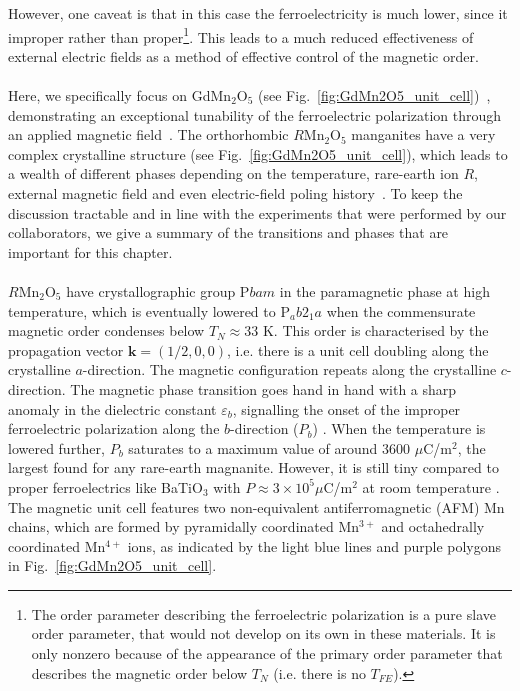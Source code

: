 However, one caveat is that in this case the ferroelectricity is much lower, since it improper rather than proper\footnote{The order parameter describing the ferroelectric polarization is a pure slave order parameter, that would not develop on its own in these materials. It is only nonzero because of the appearance of the primary order parameter that describes the magnetic order below $T_N$ (i.e. there is no $T_{FE}$).}.
This leads to a much reduced effectiveness of external electric fields as a method of effective control of the magnetic order.  
\\\\
Here, we specifically focus on GdMn$_2$O$_5$ (see Fig.~\ref{fig:GdMn2O5_unit_cell})~\cite{Khomskii2009}, demonstrating an exceptional tunability of the ferroelectric polarization through an applied magnetic field~\cite{Lee13}.
The orthorhombic $R$Mn$_2$O$_5$ manganites have a very complex crystalline structure (see Fig.~\ref{fig:GdMn2O5_unit_cell}), which leads to a wealth of different phases depending on the temperature, rare-earth ion $R$, external magnetic field and even electric-field poling history~\cite{Zheng2019}.
To keep the discussion tractable and in line with the experiments that were performed by our collaborators, we give a summary of the transitions and phases that are important for this chapter.
\\\\
$R$Mn$_2$O$_5$ have crystallographic group P$bam$ \cite{Alonso97} in the paramagnetic phase at high temperature, which is eventually lowered to P$_ab2_1a$ when the commensurate magnetic order condenses below $T_{N} \approx 33$ K.
This order is characterised by the propagation vector $\bm{k} = (1/2, 0, 0)$, i.e. there is a unit cell doubling along the crystalline $a$-direction.
The magnetic configuration repeats along the crystalline $c$-direction. The magnetic phase transition goes hand in hand with a sharp anomaly in the dielectric constant $\varepsilon_b$, signalling the onset of the improper ferroelectric polarization  along the $b$-direction ($P_b$) \cite{Lee13}.
When the temperature is lowered further, $P_b$ saturates to a maximum value of around 3600 $\mu$C/m$^2$, the largest found for any rare-earth magnanite.
However, it is still tiny compared to proper ferroelectrics like BaTiO$_3$ with $P \approx 3 \times 10^5 \mu $C/m$^2$ at room temperature \cite{Mason1948,VonHippel1950}.
The magnetic unit cell features two non-equivalent antiferromagnetic (AFM) Mn chains, which are formed by pyramidally coordinated Mn$^{3+}$ and octahedrally coordinated Mn$^{4+}$ ions, as indicated by the light blue lines and purple polygons in Fig.~\ref{fig:GdMn2O5_unit_cell}.
